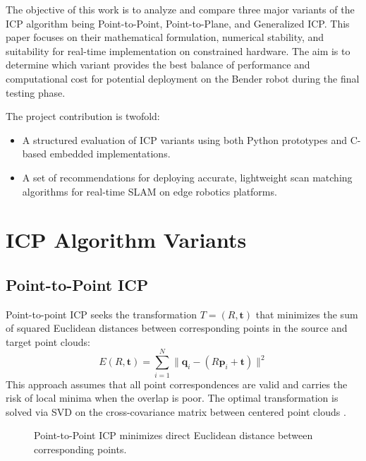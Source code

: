 \documentclass[11pt]{article}
\begin{document}
The objective of this work is to analyze and compare three major variants of the ICP algorithm being Point-to-Point, Point-to-Plane, and Generalized ICP. This paper focuses on their mathematical formulation, numerical stability, and suitability for real-time implementation on constrained hardware. The aim is to determine which variant provides the best balance of performance and computational cost for potential deployment on the Bender robot during the final testing phase.

The project contribution is twofold:
\begin{itemize}
    \item A structured evaluation of ICP variants using both Python prototypes and C-based embedded implementations.
    \item A set of recommendations for deploying accurate, lightweight scan matching algorithms for real-time SLAM on edge robotics platforms.
\end{itemize}

\section{ICP Algorithm Variants}

\subsection{Point-to-Point ICP}
Point-to-point ICP seeks the transformation $T = (R, \mathbf{t})$ that minimizes the sum of squared Euclidean distances between corresponding points in the source and target point clouds:
\[
E(R, \mathbf{t}) = \sum_{i=1}^N \| \mathbf{q}_i - (R\mathbf{p}_i + \mathbf{t}) \|^2
\]
This approach assumes that all point correspondences are valid and carries the risk of local minima when the overlap is poor. The optimal transformation is solved via SVD on the cross-covariance matrix between centered point clouds \citep{donoso2017icp}.

\begin{figure}[h]
\centering
{}
\caption{Point-to-Point ICP minimizes direct Euclidean distance between corresponding points.}
\label{fig:ptp_icp}
\end{figure}  
\end{document}
